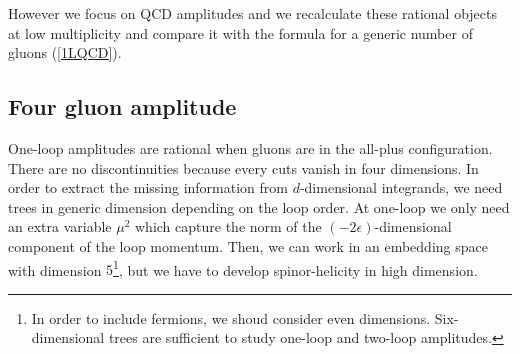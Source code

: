 However we focus on QCD amplitudes and we recalculate these rational objects at low multiplicity and compare it with the formula for a generic number of gluons (\ref{1LQCD}).

\subsection{Four gluon amplitude}
One-loop amplitudes are rational when gluons are in the all-plus configuration. There are no discontinuities because every cuts vanish in four dimensions. In order to extract the missing information from $d$-dimensional integrands, we need trees in generic dimension depending on the loop order. At one-loop we only need an extra variable $\mu^2$ which capture the norm of the $(-2\epsilon)$-dimensional component of the loop momentum. Then, we can work in an embedding space with dimension $5$\footnote{In order to include fermions, we shoud consider even dimensions. Six-dimensional trees are sufficient to study one-loop and two-loop amplitudes.}, but we have to develop spinor-helicity in high dimension.\\

